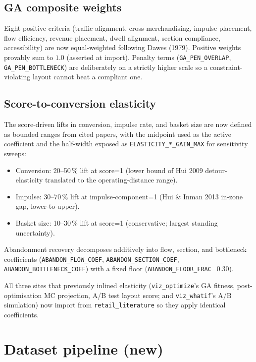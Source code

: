 \documentclass[11pt]{article}
\begin{document}
\subsection{GA composite weights}

Eight positive criteria (traffic alignment, cross-merchandising,
impulse placement, flow efficiency, revenue placement, dwell
alignment, section compliance, accessibility) are now equal-weighted
following Dawes (1979). Positive weights provably sum to $1.0$
(asserted at import). Penalty terms (\texttt{GA\_PEN\_OVERLAP},
\texttt{GA\_PEN\_BOTTLENECK}) are deliberately on a strictly higher
scale so a constraint-violating layout cannot beat a compliant one.

\subsection{Score-to-conversion elasticity}

The score-driven lifts in conversion, impulse rate, and basket size
are now defined as bounded ranges from cited papers, with the midpoint
used as the active coefficient and the half-width exposed as
\texttt{ELASTICITY\_*\_GAIN\_MAX} for sensitivity sweeps:

\begin{itemize}[leftmargin=*]
  \item Conversion: 20--50\,\% lift at score=1 (lower bound of
    Hui 2009 detour-elasticity translated to the operating-distance
    range).
  \item Impulse: 30--70\,\% lift at impulse-component=1
    (Hui \& Inman 2013 in-zone gap, lower-to-upper).
  \item Basket size: 10--30\,\% lift at score=1 (conservative;
    largest standing uncertainty).
\end{itemize}

Abandonment recovery decomposes additively into flow, section, and
bottleneck coefficients (\texttt{ABANDON\_FLOW\_COEF},
\texttt{ABANDON\_SECTION\_COEF}, \texttt{ABANDON\_BOTTLENECK\_COEF})
with a fixed floor (\texttt{ABANDON\_FLOOR\_FRAC}=0.30).

All three sites that previously inlined elasticity (\texttt{viz\_optimize}'s
GA fitness, post-optimisation MC projection, A/B test layout score; and
\texttt{viz\_whatif}'s A/B simulation) now import from
\texttt{retail\_literature} so they apply identical coefficients.

\section{Dataset pipeline (new)}
\label{sec:dataset}
\end{document}
